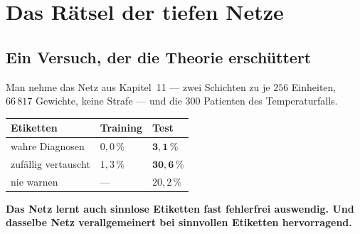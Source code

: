 \chapter{Das Rätsel der tiefen Netze}

\section{Ein Versuch, der die Theorie erschüttert}

\begin{merksatz}
Man nehme das Netz aus Kapitel~11 --- zwei Schichten zu je $256$ Einheiten, $66\,817$ Gewichte, keine Strafe --- und die $300$ Patienten des Temperaturfalls.

\begin{center}
{\small
\renewcommand{\arraystretch}{1.5}
\begin{tabular}{@{}P{3.4cm}P{2.2cm}P{2.2cm}@{}}
\toprule
\textbf{Etiketten} & \textbf{Training} & \textbf{Test}\\
\midrule
wahre Diagnosen & $0{,}0\,\%$ & $\mathbf{3{,}1\,\%}$\\
zufällig vertauscht & $1{,}3\,\%$ & $\mathbf{30{,}6\,\%}$\\
\midrule
nie warnen & --- & $20{,}2\,\%$\\
\bottomrule
\end{tabular}}
\end{center}

\begin{center}
\begin{minipage}{0.9\textwidth}
\textbf{Das Netz lernt auch sinnlose Etiketten fast fehlerfrei auswendig. Und dasselbe Netz verallgemeinert bei sinnvollen Etiketten hervorragend.}
\end{minipage}
\end{center}

\begin{center}
\begin{minipage}{0.88\textwidth}
\end{minipage}
\end{center}


\end{merksatz}
